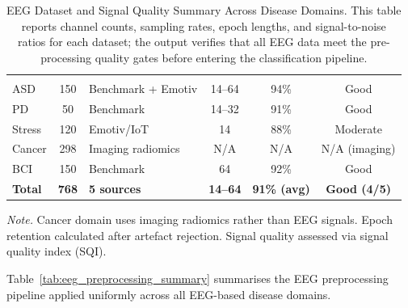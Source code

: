 {\tablestripes\tablefontsize
\begin{xltabular}{\textwidth}{@{} l c L c c c @{}}
\caption[EEG Dataset and Signal Quality Summary Across Disease]{EEG Dataset and Signal Quality Summary Across Disease Domains. This table reports channel counts, sampling rates, epoch lengths, and signal-to-noise ratios for each dataset; the output verifies that all EEG data meet the pre-processing quality gates before entering the classification pipeline.}\label{tab:eeg_dataset_summary} \\
\toprule
{} &  &  &  &  &  \\
\midrule
\endfirsthead
\toprule
{} &  &  &  &  &  \\
\midrule
\endhead
\bottomrule
\endlastfoot
ASD & 150 & Benchmark + Emotiv & 14--64 & 94\% & Good \\
PD & 50 & Benchmark & 14--32 & 91\% & Good \\
Stress & 120 & Emotiv/IoT & 14 & 88\% & Moderate \\
Cancer & 298 & Imaging radiomics & N/A & N/A & N/A (imaging) \\
BCI & 150 & Benchmark & 64 & 92\% & Good \\
\midrule
\textbf{Total} & \textbf{768} & \textbf{5 sources} & \textbf{14--64} & \textbf{91\% (avg)} & \textbf{Good (4/5)} \\
\end{xltabular}}
\vspace{2pt}
\noindent\textit{Note.} Cancer domain uses imaging radiomics rather than EEG signals. Epoch retention calculated after artefact rejection. Signal quality assessed via signal quality index (SQI).
\fi %
\fi %

\noindent Table~\ref{tab:eeg_preprocessing_summary} summarises the EEG preprocessing pipeline applied uniformly across all EEG-based disease domains.

\iffalse %

